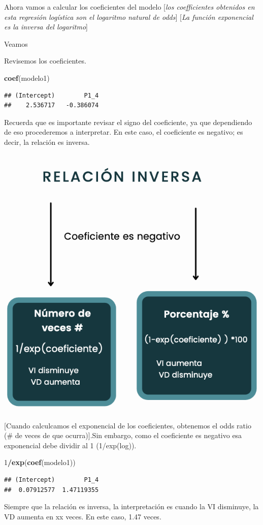 \documentclass[
]{article}
\newenvironment{Shaded}{\begin{snugshade}}{\end{snugshade}}
\newcommand{\DecValTok}[1]{\textcolor[rgb]{0.00,0.00,0.81}{#1}}
\newcommand{\FunctionTok}[1]{\textcolor[rgb]{0.13,0.29,0.53}{\textbf{#1}}}
\newcommand{\NormalTok}[1]{#1}
\newcommand{\SpecialCharTok}[1]{\textcolor[rgb]{0.81,0.36,0.00}{\textbf{#1}}}
\begin{document}
Ahora vamos a calcular los coeficientes del modelo {[}\emph{los
coefficientes obtenidos en esta regresión logística son el logaritmo
natural de odds}{]} {[}\emph{La función exponencial es la inversa del
logaritmo}{]}

Veamos

Revisemos los coeficientes.

\begin{Shaded}
\begin{Highlighting}[]
\FunctionTok{coef}\NormalTok{(modelo1)}
\end{Highlighting}
\end{Shaded}

\begin{verbatim}
## (Intercept)        P1_4 
##    2.536717   -0.386074
\end{verbatim}

Recuerda que es importante revisar el signo del coeficiente, ya que
dependiendo de eso procederemos a interpretar. En este caso, el
coeficiente es negativo; es decir, la relación es inversa.

\begin{center}\includegraphics[width=0.3\linewidth]{coef_negativo} \end{center}

{[}Cuando calculcamos el exponencial de los coeficientes, obtenemos el
odds ratio (\# de veces de que ocurra){]}.Sin embargo, como el
coeficiente es negativo esa exponencial debe dividir al 1 (1/exp(log)).

\begin{Shaded}
\begin{Highlighting}[]
\DecValTok{1}\SpecialCharTok{/}\FunctionTok{exp}\NormalTok{(}\FunctionTok{coef}\NormalTok{(modelo1)) }
\end{Highlighting}
\end{Shaded}

\begin{verbatim}
## (Intercept)        P1_4 
##  0.07912577  1.47119355
\end{verbatim}

Siempre que la relación es inversa, la interpretación es cuando la VI
disminuye, la VD aumenta en xx veces. En este caso, 1.47 veces.
\end{document}
